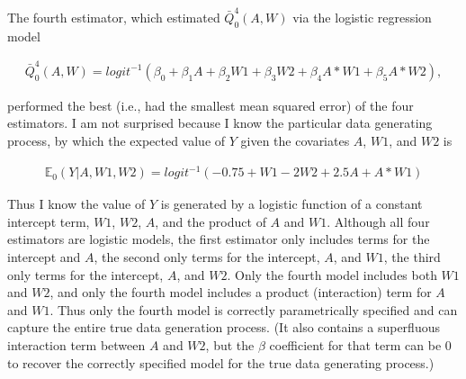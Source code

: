 \documentclass{article}\usepackage[]{graphicx}\usepackage[]{xcolor}
\begin{document}
The fourth estimator, which estimated $\bar{Q}^4_0(A,W)$ via the logistic regression model

\begin{align*}
\bar{Q}^4_0(A,W)=logit^{-1}(\beta_0+\beta_1A+\beta_2W1+\beta_3W2+\beta_4A*W1+\beta_5A*W2),
\end{align*}

performed the best (i.e., had the smallest mean squared error) of the four estimators.  I am not surprised because I know the particular data generating process, by which the expected value of $Y$ given the covariates $A$, $W1$, and $W2$ is

\begin{align*}
\mathbb{E}_0(Y|A,W1,W2)=logit^{-1}(-0.75+W1-2W2+2.5A+A*W1)
\end{align*}

Thus I know the value of $Y$ is generated by a logistic function of a constant intercept term, $W1$, $W2$, $A$, and the product of $A$ and $W1$. Although all four estimators are logistic models, the first estimator only includes terms for the intercept and $A$, the second only terms for the intercept, $A$, and $W1$, the third only terms for the intercept, $A$, and $W2$. Only the fourth model includes both $W1$ and $W2$, and only the fourth model includes a product (interaction) term for $A$ and $W1$. Thus only the fourth model is correctly parametrically specified and can capture the entire true data generation process. (It also contains a superfluous interaction term between $A$ and $W2$, but the $\beta$ coefficient for that term can be 0 to recover the correctly specified model for the true data generating process.)
      
\end{document}
